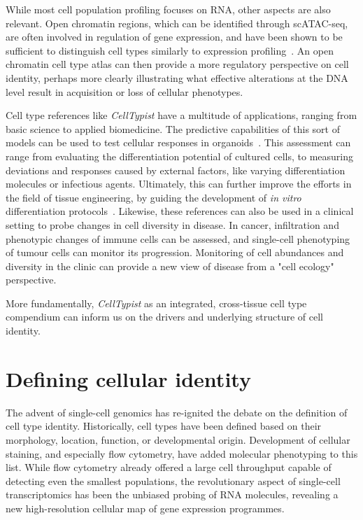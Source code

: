 While most cell population profiling focuses on RNA, other aspects are also relevant. Open chromatin regions, which can be identified through scATAC-seq, are often involved in regulation of gene expression, and have been shown to be sufficient to distinguish cell types similarly to expression profiling~\citep{cusanovich_single-cell_2018}. An open chromatin cell type atlas can then provide a more regulatory perspective on cell identity, perhaps more clearly illustrating what effective alterations at the DNA level result in acquisition or loss of cellular phenotypes.

Cell type references like \textit{CellTypist} have a multitude of applications, ranging from basic science to applied biomedicine. The predictive capabilities of this sort of models can be used to test cellular responses in organoids~\citep{brazovskaja_high-throughput_2019}. This assessment can range from evaluating the differentiation potential of cultured cells, to measuring deviations and responses caused by external factors, like varying differentiation molecules or infectious agents. Ultimately, this can further improve the efforts in the field of tissue engineering, by guiding the development of \textit{in vitro} differentiation protocols~\citep{camp_single-cell_2018}. Likewise, these references can also be used in a clinical setting to probe changes in cell diversity in disease. In cancer, infiltration and phenotypic changes of immune cells can be assessed, and single-cell phenotyping of tumour cells can monitor its progression. Monitoring of cell abundances and diversity in the clinic can provide a new view of disease from a "cell ecology" perspective.

More fundamentally, \textit{CellTypist} as an integrated, cross-tissue cell type compendium can inform us on the drivers and underlying structure of cell identity.


\section{Defining cellular identity}
\label{section_ident}
The advent of single-cell genomics has re-ignited the debate on the definition of cell type identity. Historically, cell types have been defined based on their morphology, location, function, or developmental origin. Development of cellular staining, and especially flow cytometry, have added molecular phenotyping to this list. While flow cytometry already offered a large cell throughput capable of detecting even the smallest populations, the revolutionary aspect of single-cell transcriptomics has been the unbiased probing of RNA molecules, revealing a new high-resolution cellular map of gene expression programmes.

